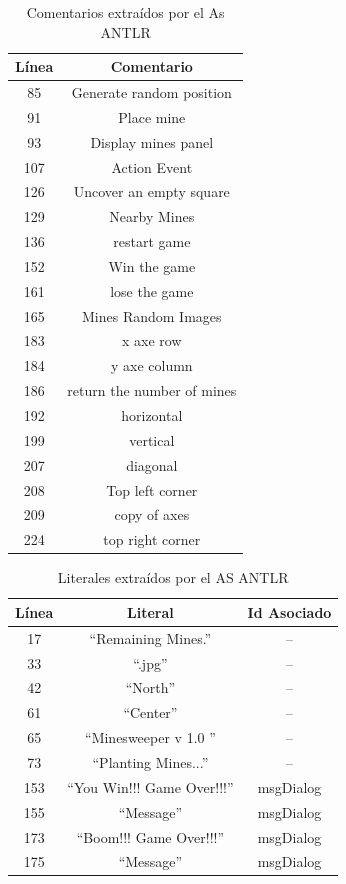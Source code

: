 \begin{table}[ht!]
{		\centering
   		\begin{tabular}{| c | c |}  
       \hline
\textbf{Línea} & \textbf{Comentario} \\ \hline
85&Generate random position \\ \hline
91&Place mine \\ \hline
93&Display mines panel \\ \hline
107&Action Event \\ \hline
126&Uncover an empty square \\ \hline
129&Nearby Mines \\ \hline
136&restart game \\ \hline
152&Win the game \\ \hline
161&lose the game \\ \hline
165&Mines Random Images \\ \hline
183&x axe row \\ \hline
184&y axe column \\ \hline
186&return the number of mines \\ \hline
192&horizontal \\ \hline
199&vertical \\ \hline
207&diagonal \\ \hline
208&Top left corner \\ \hline
209&copy of axes \\ \hline
224&top right corner \\ \hline
\end{tabular}
}
\caption{Comentarios extraídos por el As ANTLR}\label{tabla3}
\end{table}


\begin{table}[h!]
	
		\centering
   		\begin{tabular}{| c | c | c |}      
       \hline
  	   \textbf{Línea} & \textbf{Literal} & \textbf{Id Asociado} \\ \hline
17&“Remaining Mines.”&--  \\ \hline
33&“.jpg”&--  \\ \hline
42&“North”&--  \\ \hline
61&“Center”&--  \\ \hline
65&“Minesweeper v 1.0 ”&--  \\ \hline
73&“Planting Mines...”&--  \\ \hline
153&“You Win!!! Game Over!!!”&msgDialog\\ \hline
155&“Message”&msgDialog\\ \hline
173&“Boom!!! Game Over!!!”&msgDialog\\ \hline
175&“Message”&msgDialog\\ \hline
  \end{tabular} 
	 
   \caption{Literales extraídos por el AS ANTLR}
   \label{tabla4}
     
\end{table} 


